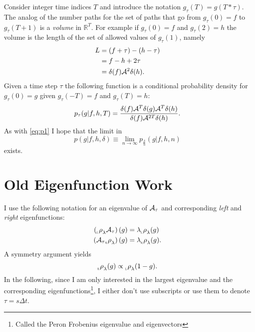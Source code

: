 \documentclass[12pt]{article} \usepackage{amsmath,amsfonts}
\newcommand{\Aop}{{\cal A}}
\newcommand{\rightfunction}{{_{_{\scalebox{.4}{R}}} \rho}}
\newcommand{\leftfunction}{{_{_{\scalebox{.4}{L}}} \rho}}
\newcommand{\field}[1]{\mathbb{#1}}
\newcommand\REAL{\field{R}}
\begin{document}
Consider integer time indices $T$ and introduce the notation
$g_\tau(T)= g(T*\tau)$.  The analog of the number paths for the set of
paths that go from $g_\tau(0)=f$ to $g_\tau(T+1)$ is a \emph{volume}
in $\REAL^T$.  For example if $g_\tau(0) = f$ and $g_\tau(2) = h$ the
volume is the length of the set of allowed values of $g_\tau(1)$,
namely
\begin{align*}
  L &= (f+\tau) - (h-\tau) \\
  &= f-h+2\tau \\
  &= \delta(f) \Aop^2 \delta(h).
\end{align*}
Given a time step $\tau$ the following function is a conditional
probability density for $g_\tau(0)=g$ given $g_\tau(-T)=f$ and
$g_\tau(T)=h$:
\begin{equation*}
  p_\tau(g|f,h,T) = \frac{\delta(f) \Aop^T \delta(g) \Aop^T \delta(h)}
  {\delta(f) \Aop^{2T} \delta(h)}. 
\end{equation*}
As with \eqref{eq:p1} I hope that the limit in
\begin{equation}
  \label{eq:p2}
  p(g|f,h,\delta) \equiv \lim_{n\rightarrow\infty}
  p_{\frac{\delta}{n}} (g|f,h,n)
\end{equation}
exists.

\section{Old Eigenfunction Work}

I use the following notation for an eigenvalue of $\Aop_\tau$ and
corresponding \emph{left} and \emph{right} eigenfunctions:
\begin{align*}
 \left( \leftfunction_\lambda \Aop_\tau \right)(g) &= \lambda
 \leftfunction_\lambda (g)\\
 \left(\Aop_\tau  \rightfunction_\lambda \right)(g) &= \lambda
 \rightfunction_\lambda (g).
\end{align*}
A symmetry argument yields
\begin{equation}
  \label{eq:symmetry}
  \rightfunction_\lambda(g) \propto \leftfunction_\lambda(1-g).
\end{equation}
In the following, since I am only interested in the largest
eigenvalue and the corresponding eigenfunctions\footnote{Called
  the Peron Frobenius eigenvalue and eigenvectors}, I either don't use
subscripts or use them to denote $\tau=s\Delta t$.
\end{document}
